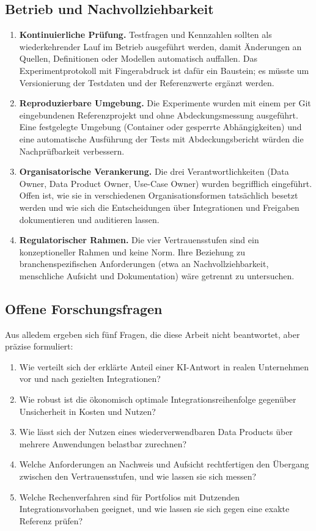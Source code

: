 \documentclass[a4paper,12pt,twoside]{report}
\theoremstyle{definition}
\begin{document}
\subsection{Betrieb und Nachvollziehbarkeit}
\begin{enumerate}
\item \textbf{Kontinuierliche Prüfung.} Testfragen und Kennzahlen sollten als wiederkehrender Lauf im Betrieb ausgeführt werden, damit Änderungen an Quellen, Definitionen oder Modellen automatisch auffallen. Das Experimentprotokoll mit Fingerabdruck ist dafür ein Baustein; es müsste um Versionierung der Testdaten und der Referenzwerte ergänzt werden.
\item \textbf{Reproduzierbare Umgebung.} Die Experimente wurden mit einem per Git eingebundenen Referenzprojekt und ohne Abdeckungsmessung ausgeführt. Eine festgelegte Umgebung (Container oder gesperrte Abhängigkeiten) und eine automatische Ausführung der Tests mit Abdeckungsbericht würden die Nachprüfbarkeit verbessern.
\item \textbf{Organisatorische Verankerung.} Die drei Verantwortlichkeiten (Data Owner, Data Product Owner, Use-Case Owner) wurden begrifflich eingeführt. Offen ist, wie sie in verschiedenen Organisationsformen tatsächlich besetzt werden und wie sich die Entscheidungen über Integrationen und Freigaben dokumentieren und auditieren lassen.
\item \textbf{Regulatorischer Rahmen.} Die vier Vertrauensstufen sind ein konzeptioneller Rahmen und keine Norm. Ihre Beziehung zu branchenspezifischen Anforderungen (etwa an Nachvollziehbarkeit, menschliche Aufsicht und Dokumentation) wäre getrennt zu untersuchen.
\end{enumerate}

\subsection{Offene Forschungsfragen}
Aus alledem ergeben sich fünf Fragen, die diese Arbeit nicht beantwortet, aber präzise formuliert:
\begin{enumerate}
\item Wie verteilt sich der erklärte Anteil einer KI-Antwort in realen Unternehmen vor und nach gezielten Integrationen?
\item Wie robust ist die ökonomisch optimale Integrationsreihenfolge gegenüber Unsicherheit in Kosten und Nutzen?
\item Wie lässt sich der Nutzen eines wiederverwendbaren Data Products über mehrere Anwendungen belastbar zurechnen?
\item Welche Anforderungen an Nachweis und Aufsicht rechtfertigen den Übergang zwischen den Vertrauensstufen, und wie lassen sie sich messen?
\item Welche Rechenverfahren sind für Portfolios mit Dutzenden Integrationsvorhaben geeignet, und wie lassen sie sich gegen eine exakte Referenz prüfen?
\end{enumerate}
\end{document}
